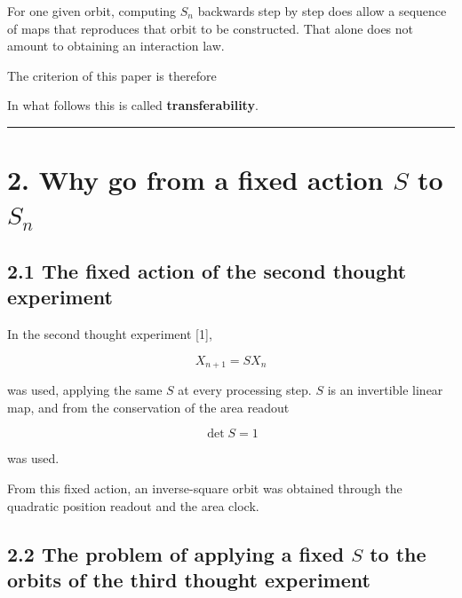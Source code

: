 \documentclass[
  a4paper,
]{article}
\begin{document}
For one given orbit, computing \(S_n\) backwards step by step does allow
a sequence of maps that reproduces that orbit to be constructed. That
alone does not amount to obtaining an interaction law.

The criterion of this paper is therefore

\begin{center}
\end{center}

In what follows this is called \textbf{transferability}.

\begin{center}\rule{0.5\linewidth}{0.5pt}\end{center}

\section{\texorpdfstring{2. Why go from a fixed action \(S\) to
\(S_n\)}{2. Why go from a fixed action S to S\_n}}\label{why-go-from-a-fixed-action-s-to-s_n}

\subsection{2.1 The fixed action of the second thought
experiment}\label{the-fixed-action-of-the-second-thought-experiment}

In the second thought experiment {[}1{]},

\[
X_{n+1}=SX_n
\]

was used, applying the same \(S\) at every processing step. \(S\) is an
invertible linear map, and from the conservation of the area readout

\[
\det S=1
\]

was used.

From this fixed action, an inverse-square orbit was obtained through the
quadratic position readout and the area clock.

\subsection{\texorpdfstring{2.2 The problem of applying a fixed \(S\) to
the orbits of the third thought
experiment}{2.2 The problem of applying a fixed S to the orbits of the third thought experiment}}\label{the-problem-of-applying-a-fixed-s-to-the-orbits-of-the-third-thought-experiment}
\end{document}
